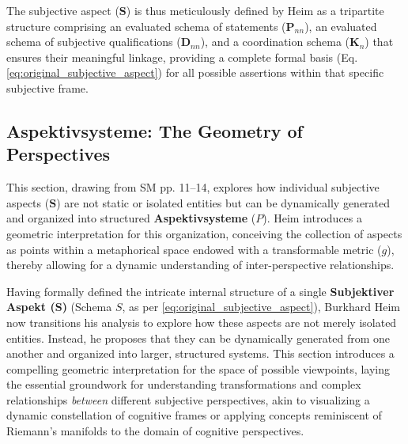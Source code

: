 \documentclass[12pt]{article}
\newcommand{\aspektivsystem}{P}
\begin{document}
The subjective aspect (\(\mathbf{S}\)) is thus meticulously defined by Heim as a tripartite structure comprising an evaluated schema of statements (\(\mathbf{P}_{nn}\)), an evaluated schema of subjective qualifications (\(\mathbf{D}_{nn}\)), and a coordination schema (\(\mathbf{K}_n\)) that ensures their meaningful linkage, providing a complete formal basis (Eq. \eqref{eq:original_subjective_aspect}) for all possible assertions within that specific subjective frame.

\subsection{Aspektivsysteme: The Geometry of Perspectives}
\label{sec:aspektivsysteme}

This section, drawing from SM pp. 11--14, explores how individual subjective aspects (\(\mathbf{S}\)) are not static or isolated entities but can be dynamically generated and organized into structured \textbf{Aspektivsysteme} (\(\aspektivsystem\)). Heim introduces a geometric interpretation for this organization, conceiving the collection of aspects as points within a metaphorical space endowed with a transformable metric (\(g\)), thereby allowing for a dynamic understanding of inter-perspective relationships.

Having formally defined the intricate internal structure of a single \textbf{Subjektiver Aspekt (\(\mathbf{S}\))} (Schema \(S\), as per \eqref{eq:original_subjective_aspect}), Burkhard Heim now transitions his analysis to explore how these aspects are not merely isolated entities. Instead, he proposes that they can be dynamically generated from one another and organized into larger, structured systems. This section introduces a compelling geometric interpretation for the space of possible viewpoints, laying the essential groundwork for understanding transformations and complex relationships \textit{between} different subjective perspectives, akin to visualizing a dynamic constellation of cognitive frames or applying concepts reminiscent of Riemann's manifolds to the domain of cognitive perspectives.
\end{document}
